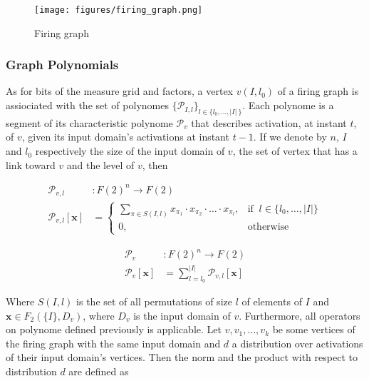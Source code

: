 \documentclass[a4paper, 11pt]{article}
\begin{document}
 \begin{figure}[H]
 \centering
   \texttt{[image: figures/firing\_graph.png]}
 \caption{Firing graph}
 \label{fig:firing_graph}
\end{figure}

\subsubsection*{Graph Polynomials}

As for bits of the measure grid and factors, a vertex $v(I, l_0)$ of a firing graph is assiociated with the set of polynomes $\lbrace \mathcal{P}_{I, l} \rbrace_{l \in \{l_0, \ldots, \vert I \vert \ \}}$. Each polynome is a segment of its characteristic polynome $\mathcal{P}_v$ that describes activation, at instant $t$, of $v$, given its input domain's activations at instant $t-1$. If we denote by $n$, $I$ and $l_0$ respectively the size of the input domain of $v$, the set of vertex that has a link toward $v$ and the level of $v$, then 

\vspace{10px}\noindent\begin{minipage}{.5\linewidth}
\begin{align*}
\mathcal{P}_{v, l}&: F(2)^{n} \rightarrow F(2)\\
\mathcal{P}_{v, l}[\textbf{x}] &= \begin{cases} \sum_{\pi \in S(I, l)} x_{\pi_1} \cdot x_{\pi_2} \cdot \ldots \cdot x_{\pi_l}, & \text{if }\ l \in \lbrace l_0, \ldots, \vert I \vert \rbrace \\ 0, & \text{otherwise} \end{cases}
\end{align*}
\end{minipage}%
\noindent\begin{minipage}{.5\linewidth}
\begin{align*}
\mathcal{P}_v &: F(2)^{n} \rightarrow F(2)\\
\mathcal{P}_v[\textbf{x}]  &= \sum_{l = l_0}^{\vert I \vert} \mathcal{P}_{v, l}[\textbf{x}]
\end{align*}
\end{minipage}\vspace{15px}

Where $S(I, l)$ is the set of all permutations of size $l$ of elements of $I$ and $\textbf{x} \in F_2(\{ I \}, D_v)$, where $D_v$ is the input domain of $v$. Furthermore, all operators on polynome defined previously is applicable. Let $v, v_1, \ldots, v_k$  be some vertices of the firing graph with the same input domain and $d$ a distribution over activations of their input domain's vertices. Then the norm and the product with respect to distribution $d$ are defined as
\end{document}
